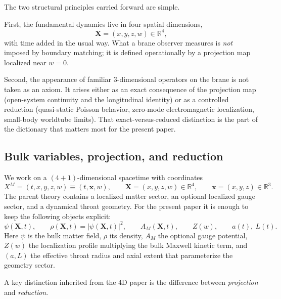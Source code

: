 \documentclass[11pt]{article}
\newcommand{\R}{\mathbb R}
\newcommand{\X}{\mathbf X}
\newcommand{\x}{\mathbf x}
\newcommand{\Zloc}{Z}
\begin{document}
The two structural principles carried forward are simple.

First, the fundamental dynamics live in four spatial dimensions,
\[
\mathbf{X}=(x,y,z,w)\in\mathbb R^4,
\]
with time added in the usual way. What a brane observer measures is \emph{not} imposed by
boundary matching; it is defined operationally by a projection map localized near
\(w=0\).

Second, the appearance of familiar \(3\)-dimensional operators on the brane is not taken
as an axiom. It arises either as an exact consequence of the projection map
(open-system continuity and the longitudinal identity) or as a controlled reduction
(quasi-static Poisson behavior, zero-mode electromagnetic localization, small-body
worldtube limits). That exact-versus-reduced distinction is the part of the dictionary
that matters most for the present paper.

\subsection{Bulk variables, projection, and reduction}
\label{sec:dictionary-bulk}

We work on a \((4+1)\)-dimensional spacetime with coordinates
\begin{equation}
X^M=(t,x,y,z,w)\equiv (t,\x,w),
\qquad
\X=(x,y,z,w)\in\R^4,
\qquad
\x=(x,y,z)\in\R^3.
\end{equation}
The parent theory contains a localized matter sector, an optional localized gauge sector,
and a dynamical throat geometry. For the present paper it is enough to keep the following
objects explicit:
\begin{equation}
\psi(\X,t),
\qquad
\rho(\X,t)=|\psi(\X,t)|^2,
\qquad
A_M(\X,t),
\qquad
\Zloc(w),
\qquad
a(t),\ L(t).
\end{equation}
Here \(\psi\) is the bulk matter field, \(\rho\) its density, \(A_M\) the optional gauge
potential, \(\Zloc(w)\) the localization profile multiplying the bulk Maxwell kinetic
term, and \((a,L)\) the effective throat radius and axial extent that parameterize the
geometry sector.

A key distinction inherited from the 4D paper is the difference between
\emph{projection} and \emph{reduction}.
\end{document}
